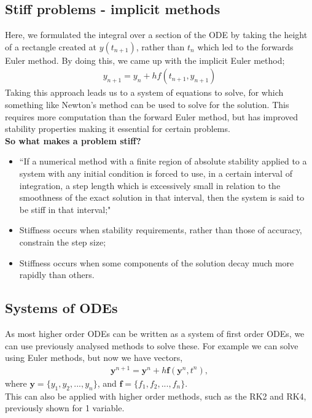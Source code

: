 \documentclass[11pt,a4paper]{report}
\begin{document}
	\subsection{Stiff problems - implicit methods}
		Here, we formulated the integral over a section of the ODE by taking the height of a rectangle created at $y(t_{n+1})$, rather than $t_n$ which led to the forwards Euler method. By doing this, we came up with the implicit Euler method;
		\begin{align}
			y_{n+1} = y_n + h f(t_{n+1}, y_{n+1})
		\end{align}
		Taking this approach leads us to a system of equations to solve, for which something like Newton's method can be used to solve for the solution. This requires more computation than the forward Euler method, but has improved stability properties making it essential for certain problems.\\
		\textbf{So what makes a problem stiff?} 
		\begin{itemize}
			\item ``If a numerical method with a  finite region of absolute stability applied to a system with any initial condition is forced to use, in a certain interval of integration, a step length which is excessively small in relation to the smoothness of the exact solution in that interval, then the system is said to be stiff in that interval;"
			\item  Stiffness occurs when stability requirements, rather than those of accuracy, constrain the step size;
			\item Stiffness occurs when some components of the solution decay much more rapidly than others.
		\end{itemize}
	\subsection{Systems of ODEs}
		As most higher order ODEs can be written as a system of first order ODEs, we can use previously analysed methods to solve these. For example we can solve using Euler methods, but now we have vectors,
		\newcommand{\bm}{\mathbf}
		\newcommand{\np}{^{n+1}}
		\begin{align}
			\bm{y}\np = \bm{y}^n + h \bm{f} ( \bm{y}^n, t^n),
		\end{align}
		where $\bm{y}=\{y_1,y_2,...,y_n\}$, and $\bm{f}=\{f_1,f_2,...,f_n\}$. \\
		
		This can also be applied with higher order methods, such as the RK2 and RK4, previously shown for 1 variable.
\end{document}
